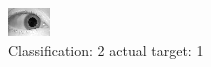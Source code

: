 \begin{figure}[h!]
\begin{center}
\includegraphics[width=0.60\columnwidth]{figures/ID1497_class_2_target_1.png}
\end{center}
\caption{ Classification: 2 actual target: 1}
\label{fig:ID1497_class_2_target_1}
\end{figure}
